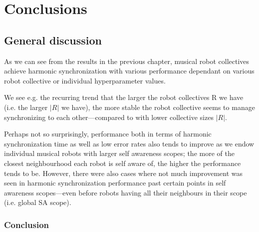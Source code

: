 \chapter{Conclusions} %
\label{chap:conclusions}







\section{General discussion}

	As we can see from the results in the previous chapter, musical robot collectives achieve harmonic synchronization with various performance dependant on various robot collective or individual hyperparameter values.
	
	We see e.g. the recurring trend that the larger the robot collectives R we have (i.e. the larger $|R|$ we have), the more stable the robot collective seems to manage synchronizing to each other—compared to with lower collective sizes $|R|$.
	
	Perhaps not so surprisingly, performance both in terms of harmonic synchronization time as well as low error rates also tends to improve as we endow individual musical robots with larger self awareness scopes; the more of the closest neighbourhood each robot is self aware of, the higher the performance tends to be. However, there were also cases where not much improvement was seen in harmonic synchronization performance past certain points in self awareness scopes—even before robots having all their neighbours in their scope (i.e. global SA scope).


	\subsection{Conclusion}

